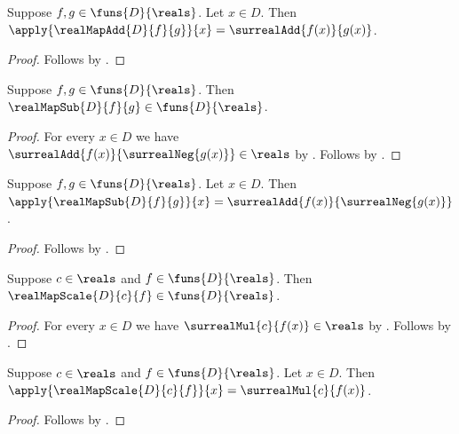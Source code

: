 \begin{proposition}\label{real_map_add_apply}
    Suppose $f,g\in\funs{D}{\reals}$.
    Let $x\in D$.
    Then $\apply{\realMapAdd{D}{f}{g}}{x}=\surrealAdd{f(x)}{g(x)}$.
\end{proposition}
\begin{proof}
    Follows by
        .
\end{proof}

\begin{proposition}\label{real_map_sub_type}
    Suppose $f,g\in\funs{D}{\reals}$.
    Then $\realMapSub{D}{f}{g}\in\funs{D}{\reals}$.
\end{proposition}
\begin{proof}
    For every $x\in D$ we have
        $\surrealAdd{f(x)}{\surrealNeg{g(x)}}\in\reals$
        by
        .
    Follows by
        .
\end{proof}

\begin{proposition}\label{real_map_sub_apply}
    Suppose $f,g\in\funs{D}{\reals}$.
    Let $x\in D$.
    Then $\apply{\realMapSub{D}{f}{g}}{x}=
        \surrealAdd{f(x)}{\surrealNeg{g(x)}}$.
\end{proposition}
\begin{proof}
    Follows by
        .
\end{proof}

\begin{proposition}\label{real_map_scale_type}
    Suppose $c\in\reals$ and $f\in\funs{D}{\reals}$.
    Then $\realMapScale{D}{c}{f}\in\funs{D}{\reals}$.
\end{proposition}
\begin{proof}
    For every $x\in D$ we have $\surrealMul{c}{f(x)}\in\reals$
        by .
    Follows by
        .
\end{proof}

\begin{proposition}\label{real_map_scale_apply}
    Suppose $c\in\reals$ and $f\in\funs{D}{\reals}$.
    Let $x\in D$.
    Then $\apply{\realMapScale{D}{c}{f}}{x}=\surrealMul{c}{f(x)}$.
\end{proposition}
\begin{proof}
    Follows by
        .
\end{proof}

